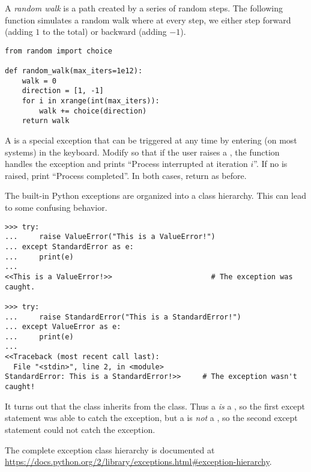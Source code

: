 \begin{problem} %
A \emph{random walk} is a path created by a series of random steps.
The following function simulates a random walk where at every step, we either step forward (adding $1$ to the total) or backward (adding $-1$).

\begin{lstlisting}
from random import choice

def random_walk(max_iters=1e12):
    walk = 0
    direction = [1, -1]
    for i in xrange(int(max_iters)):
        walk += choice(direction)
    return walk
\end{lstlisting}

A  is a special exception that can be triggered at any time by entering  (on most systems) in the keyboard.
Modify  so that if the user raises a , the function handles the exception and prints ``Process interrupted at iteration $i$''.
If no  is raised, print ``Process completed''.
In both cases, return  as before.
\end{problem}

\begin{info} %
The built-in Python exceptions are organized into a class hierarchy.
This can lead to some confusing behavior.

\begin{lstlisting}
>>> try:
...     raise ValueError("This is a ValueError!")
... except StandardError as e:
...     print(e)
...
<<This is a ValueError!>>                       # The exception was caught.

>>> try:
...     raise StandardError("This is a StandardError!")
... except ValueError as e:
...     print(e)
...
<<Traceback (most recent call last):
  File "<stdin>", line 2, in <module>
StandardError: This is a StandardError!>>     # The exception wasn't caught!
\end{lstlisting}

It turns out that the  class inherits from the  class.
Thus a  \emph{is} a , so the first except statement was able to catch the exception, but a  is \emph{not} a , so the second except statement could not catch the exception.

The complete exception class hierarchy is documented at \url{https://docs.python.org/2/library/exceptions.html#exception-hierarchy}.
\end{info}

